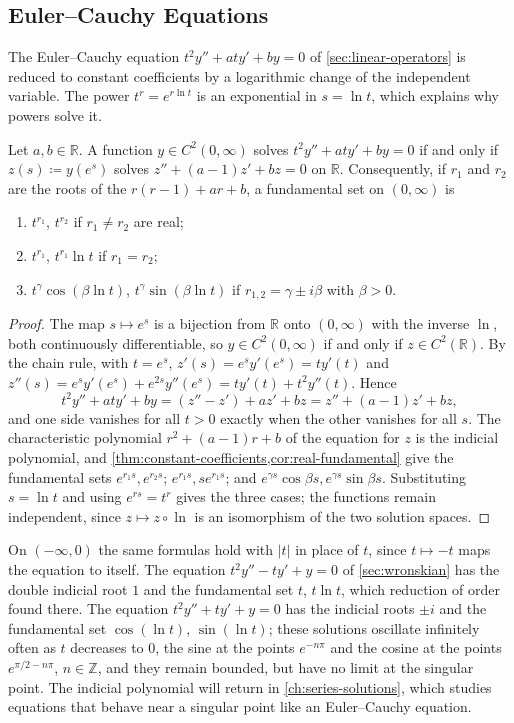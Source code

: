 \subsection{Euler--Cauchy Equations}

The Euler--Cauchy equation $t^2y''+aty'+by=0$ of \cref{sec:linear-operators} is reduced to constant coefficients by a logarithmic change of the independent variable. The power $t^r=e^{r\ln t}$ is an exponential in $s=\ln t$, which explains why powers solve it.

\begin{proposition}
\label{prop:euler-cauchy}
Let $a,b\in\mathbb R$. A function $y\in C^2(0,\infty)$ solves $t^2y''+aty'+by=0$ if and only if $z(s)\coloneqq y(e^s)$ solves $z''+(a-1)z'+bz=0$ on $\mathbb R$. Consequently, if $r_1$ and $r_2$ are the roots of the  $r(r-1)+ar+b$, a fundamental set on $(0,\infty)$ is
\begin{enumerate}
\item $t^{r_1}$, $t^{r_2}$ if $r_1\ne r_2$ are real;
\item $t^{r_1}$, $t^{r_1}\ln t$ if $r_1=r_2$;
\item $t^\gamma\cos(\beta\ln t)$, $t^\gamma\sin(\beta\ln t)$ if $r_{1,2}=\gamma\pm i\beta$ with $\beta>0$.
\end{enumerate}
\end{proposition}

\begin{proof}
The map $s\mapsto e^s$ is a bijection from $\mathbb R$ onto $(0,\infty)$ with the inverse $\ln$, both continuously differentiable, so $y\in C^2(0,\infty)$ if and only if $z\in C^2(\mathbb R)$. By the chain rule, with $t=e^s$, $z'(s)=e^sy'(e^s)=ty'(t)$ and $z''(s)=e^sy'(e^s)+e^{2s}y''(e^s)=ty'(t)+t^2y''(t)$. Hence
\[
t^2y''+aty'+by=(z''-z')+az'+bz=z''+(a-1)z'+bz ,
\]
and one side vanishes for all $t>0$ exactly when the other vanishes for all $s$. The characteristic polynomial $r^2+(a-1)r+b$ of the equation for $z$ is the indicial polynomial, and \cref{thm:constant-coefficients,cor:real-fundamental} give the fundamental sets $e^{r_1s},e^{r_2s}$; $e^{r_1s},se^{r_1s}$; and $e^{\gamma s}\cos\beta s,e^{\gamma s}\sin\beta s$. Substituting $s=\ln t$ and using $e^{rs}=t^r$ gives the three cases; the functions remain independent, since $z\mapsto z\circ\ln$ is an isomorphism of the two solution spaces.
\end{proof}

On $(-\infty,0)$ the same formulas hold with $|t|$ in place of $t$, since $t\mapsto-t$ maps the equation to itself. The equation $t^2y''-ty'+y=0$ of \cref{sec:wronskian} has the double indicial root $1$ and the fundamental set $t$, $t\ln t$, which reduction of order found there. The equation $t^2y''+ty'+y=0$ has the indicial roots $\pm i$ and the fundamental set $\cos(\ln t)$, $\sin(\ln t)$; these solutions oscillate infinitely often as $t$ decreases to $0$, the sine at the points $e^{-n\pi}$ and the cosine at the points $e^{\pi/2-n\pi}$, $n\in\mathbb Z$, and they remain bounded, but have no limit at the singular point. The indicial polynomial will return in \cref{ch:series-solutions}, which studies equations that behave near a singular point like an Euler--Cauchy equation.

